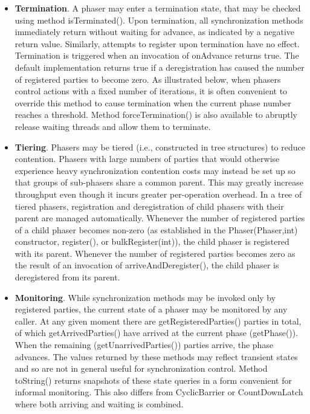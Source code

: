 \documentclass{article}
\begin{document}
\begin{itemize}
    \item \textbf{Termination}. A phaser may enter a termination state, that may be checked using method isTerminated(). Upon termination, all synchronization methods immediately return without waiting for advance, as indicated by a negative return value. Similarly, attempts to register upon termination have no effect. Termination is triggered when an invocation of onAdvance returns true. The default implementation returns true if a deregistration has caused the number of registered parties to become zero. As illustrated below, when phasers control actions with a fixed number of iterations, it is often convenient to override this method to cause termination when the current phase number reaches a threshold. Method forceTermination() is also available to abruptly release waiting threads and allow them to terminate.
    \item \textbf{Tiering}. Phasers may be tiered (i.e., constructed in tree structures) to reduce contention. Phasers with large numbers of parties that would otherwise experience heavy synchronization contention costs may instead be set up so that groups of sub-phasers share a common parent. This may greatly increase throughput even though it incurs greater per-operation overhead. In a tree of tiered phasers, registration and deregistration of child phasers with their parent are managed automatically. Whenever the number of registered parties of a child phaser becomes non-zero (as established in the Phaser(Phaser,int) constructor, register(), or bulkRegister(int)), the child phaser is registered with its parent. Whenever the number of registered parties becomes zero as the result of an invocation of arriveAndDeregister(), the child phaser is deregistered from its parent.
    \item \textbf{Monitoring}. While synchronization methods may be invoked only by registered parties, the current state of a phaser may be monitored by any caller. At any given moment there are getRegisteredParties() parties in total, of which getArrivedParties() have arrived at the current phase (getPhase()). When the remaining (getUnarrivedParties()) parties arrive, the phase advances. The values returned by these methods may reflect transient states and so are not in general useful for synchronization control. Method toString() returns snapshots of these state queries in a form convenient for informal monitoring. This also differs from CyclicBarrier or CountDownLatch where both arriving and waiting is combined. 
\end{itemize}
\end{document}
